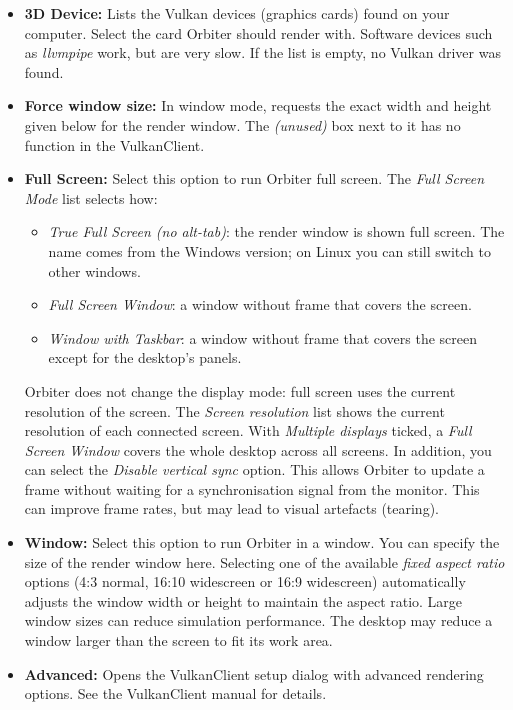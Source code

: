 \documentclass[Orbiter User Manual.tex]{subfiles}
\begin{document}
\begin{itemize}
\item \textbf{3D Device:} Lists the Vulkan devices (graphics cards) found on your computer. Select the card Orbiter should render with. Software devices such as \textit{llvmpipe} work, but are very slow. If the list is empty, no Vulkan driver was found.
\item \textbf{Force window size:} In window mode, requests the exact width and height given below for the render window. The \textit{(unused)} box next to it has no function in the VulkanClient.
\item \textbf{Full Screen:} Select this option to run Orbiter full screen. The \textit{Full Screen Mode} list selects how:
\begin{itemize}
\item \textit{True Full Screen (no alt-tab)}: the render window is shown full screen. The name comes from the Windows version; on Linux you can still switch to other windows.
\item \textit{Full Screen Window}: a window without frame that covers the screen.
\item \textit{Window with Taskbar}: a window without frame that covers the screen except for the desktop's panels.
\end{itemize}
Orbiter does not change the display mode: full screen uses the current resolution of the screen. The \textit{Screen resolution} list shows the current resolution of each connected screen.\newline
With \textit{Multiple displays} ticked, a \textit{Full Screen Window} covers the whole desktop across all screens.\newline
In addition, you can select the \textit{Disable vertical sync} option. This allows Orbiter to update a frame without waiting for a synchronisation signal from the monitor. This can improve frame rates, but may lead to visual artefacts (tearing).
\item \textbf{Window:} Select this option to run Orbiter in a window. You can specify the size of the render window here. Selecting one of the available \textit{fixed aspect ratio} options (4:3 normal, 16:10 widescreen or 16:9 widescreen) automatically adjusts the window width or height to maintain the aspect ratio. Large window sizes can reduce simulation performance. The desktop may reduce a window larger than the screen to fit its work area.
\item \textbf{Advanced:} Opens the VulkanClient setup dialog with advanced rendering options. See the VulkanClient manual for details.
\end{itemize}
\end{document}
